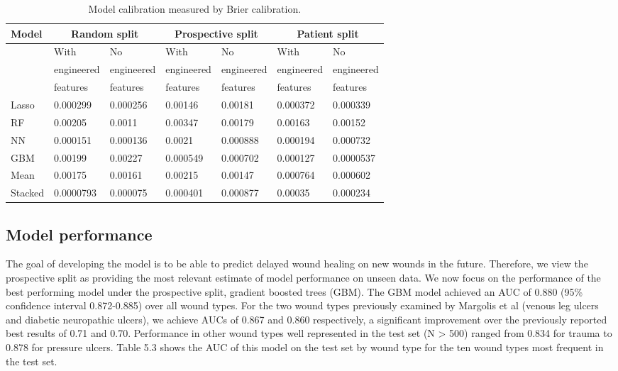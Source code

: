 \begin{table}
\begin{center}
  \begin{tabular}{|l|l|l|l|l|l|l||}
    \hline Model & \multicolumn{2}{|c|}{Random split} &
    \multicolumn{2}{|c|}{Prospective split} &
    \multicolumn{2}{|c|}{Patient split} \\
    \hline \hline
    & With & No & With & No & With & No \\
    & engineered & engineered & engineered &
    engineered & engineered & engineered \\
    & features & features & features & features & features & features \\
    \hline \hline
    Lasso & 0.000299 & 0.000256 & 0.00146 & 0.00181 & 0.000372 & 0.000339 \\
    RF & 0.00205 & 0.0011 & 0.00347 & 0.00179 & 0.00163 & 0.00152 \\
    NN & 0.000151 & 0.000136 & 0.0021 & 0.000888 & 0.000194 & 0.000732 \\
    GBM & 0.00199 & 0.00227 & 0.000549 & 0.000702 & 0.000127 & 0.0000537 \\
    Mean & 0.00175 & 0.00161 & 0.00215 & 0.00147 & 0.000764 & 0.000602 \\
    Stacked & 0.0000793 & 0.000075 & 0.000401 & 0.000877 & 0.00035 & 0.000234 \\
    \hline
\end{tabular}
\end{center}
\caption[Model calibration measured by Brier calibration]{Model
  calibration measured by Brier calibration.}
\end{table}

\subsection{Model performance}
The goal of developing the model is to be able to predict delayed
wound healing on new wounds in the future.  Therefore, we view the
prospective split as providing the most relevant estimate of model
performance on unseen data.  We now focus on the performance of the
best performing model under the prospective split, gradient boosted
trees (GBM).  The GBM model achieved an AUC of 0.880 (95\% confidence
interval 0.872-0.885) over all wound types.  For the two wound types
previously examined by Margolis et al \cite{Margolis2003,Margolis2004}
(venous leg ulcers and diabetic neuropathic ulcers), we achieve AUCs
of 0.867 and 0.860 respectively, a significant improvement over the
previously reported best results of 0.71 and 0.70.  Performance in
other wound types well represented in the test set (N > 500) ranged
from 0.834 for trauma to 0.878 for pressure ulcers.  Table 5.3 shows
the AUC of this model on the test set by wound type for the ten wound
types most frequent in the test set.

